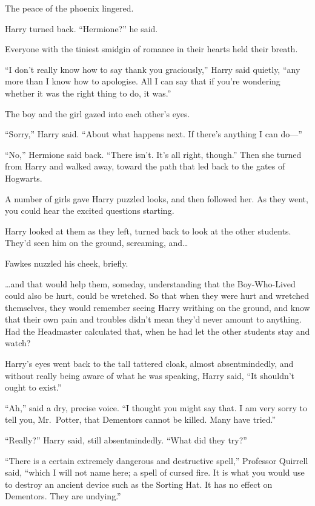 The peace of the phoenix lingered.

Harry turned back. ``Hermione?'' he said.

Everyone with the tiniest smidgin of romance in their hearts held their
breath.

``I don't really know how to say thank you graciously,'' Harry said
quietly, ``any more than I know how to apologise. All I can say that if
you're wondering whether it was the right thing to do, it was.''

The boy and the girl gazed into each other's eyes.

``Sorry,'' Harry said. ``About what happens next. If there's anything I
can do---''

``No,'' Hermione said back. ``There isn't. It's all right, though.''
Then she turned from Harry and walked away, toward the path that led
back to the gates of Hogwarts.

A number of girls gave Harry puzzled looks, and then followed her. As
they went, you could hear the excited questions starting.

Harry looked at them as they left, turned back to look at the other
students. They'd seen him on the ground, screaming, and\ldots{}

Fawkes nuzzled his cheek, briefly.

\ldots{}and that would help them, someday, understanding that the
Boy-Who-Lived could also be hurt, could be wretched. So that when they
were hurt and wretched themselves, they would remember seeing Harry
writhing on the ground, and know that their own pain and troubles didn't
mean they'd never amount to anything. Had the Headmaster calculated
that, when he had let the other students stay and watch?

Harry's eyes went back to the tall tattered cloak, almost
absentmindedly, and without really being aware of what he was speaking,
Harry said, ``It shouldn't ought to exist.''

``Ah,'' said a dry, precise voice. ``I thought you might say that. I am
very sorry to tell you, Mr.~Potter, that Dementors cannot be killed.
Many have tried.''

``Really?'' Harry said, still absentmindedly. ``What did they try?''

``There is a certain extremely dangerous and destructive spell,''
Professor Quirrell said, ``which I will not name here; a spell of cursed
fire. It is what you would use to destroy an ancient device such as the
Sorting Hat. It has no effect on Dementors. They are undying.''

